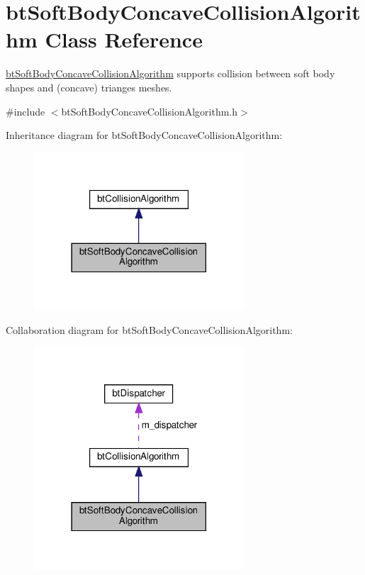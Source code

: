\hypertarget{classbtSoftBodyConcaveCollisionAlgorithm}{}\section{bt\+Soft\+Body\+Concave\+Collision\+Algorithm Class Reference}
\label{classbtSoftBodyConcaveCollisionAlgorithm}


\hyperlink{classbtSoftBodyConcaveCollisionAlgorithm}{bt\+Soft\+Body\+Concave\+Collision\+Algorithm} supports collision between soft body shapes and (concave) trianges meshes.  




{\ttfamily \#include $<$bt\+Soft\+Body\+Concave\+Collision\+Algorithm.\+h$>$}



Inheritance diagram for bt\+Soft\+Body\+Concave\+Collision\+Algorithm\+:
\nopagebreak
\begin{figure}[H]
\begin{center}
\leavevmode
\includegraphics[width=222pt]{classbtSoftBodyConcaveCollisionAlgorithm__inherit__graph}
\end{center}
\end{figure}


Collaboration diagram for bt\+Soft\+Body\+Concave\+Collision\+Algorithm\+:
\nopagebreak
\begin{figure}[H]
\begin{center}
\leavevmode
\includegraphics[width=222pt]{classbtSoftBodyConcaveCollisionAlgorithm__coll__graph}
\end{center}
\end{figure}
